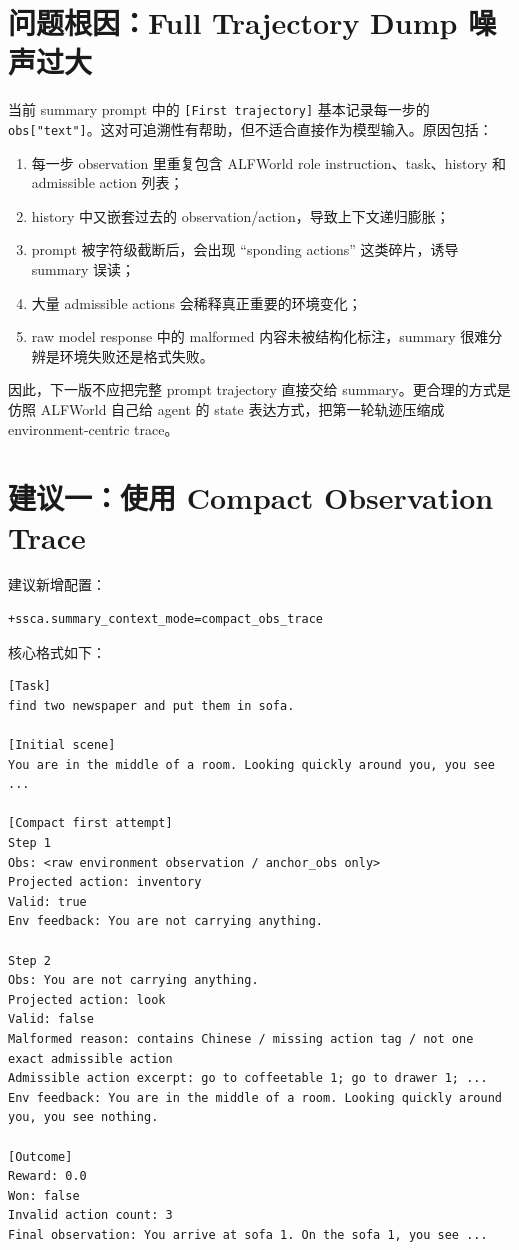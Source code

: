 \documentclass[10pt]{ctexart}
\begin{document}
\section{问题根因：Full Trajectory Dump 噪声过大}
当前 summary prompt 中的 \texttt{[First trajectory]} 基本记录每一步的 \texttt{obs["text"]}。这对可追溯性有帮助，但不适合直接作为模型输入。原因包括：
\begin{enumerate}
  \item 每一步 observation 里重复包含 ALFWorld role instruction、task、history 和 admissible action 列表；
  \item history 中又嵌套过去的 observation/action，导致上下文递归膨胀；
  \item prompt 被字符级截断后，会出现 ``sponding actions'' 这类碎片，诱导 summary 误读；
  \item 大量 admissible actions 会稀释真正重要的环境变化；
  \item raw model response 中的 malformed 内容未被结构化标注，summary 很难分辨是环境失败还是格式失败。
\end{enumerate}

因此，下一版不应把完整 prompt trajectory 直接交给 summary。更合理的方式是仿照 ALFWorld 自己给 agent 的 state 表达方式，把第一轮轨迹压缩成 environment-centric trace。

\section{建议一：使用 Compact Observation Trace}
建议新增配置：
\begin{lstlisting}
+ssca.summary_context_mode=compact_obs_trace
\end{lstlisting}

核心格式如下：
\begin{lstlisting}
[Task]
find two newspaper and put them in sofa.

[Initial scene]
You are in the middle of a room. Looking quickly around you, you see ...

[Compact first attempt]
Step 1
Obs: <raw environment observation / anchor_obs only>
Projected action: inventory
Valid: true
Env feedback: You are not carrying anything.

Step 2
Obs: You are not carrying anything.
Projected action: look
Valid: false
Malformed reason: contains Chinese / missing action tag / not one exact admissible action
Admissible action excerpt: go to coffeetable 1; go to drawer 1; ...
Env feedback: You are in the middle of a room. Looking quickly around you, you see nothing.

[Outcome]
Reward: 0.0
Won: false
Invalid action count: 3
Final observation: You arrive at sofa 1. On the sofa 1, you see ...
\end{lstlisting}
\end{document}
